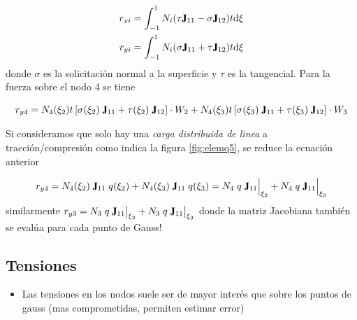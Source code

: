 \begin{align}
r_{xi}&=\int^1_{-1}N_i (\tau \jac_{11}- \sigma \jac_{12})t\di \xi \\
r_{yi}&=\int^1_{-1}N_i (\sigma \jac_{11}+\tau \jac_{12})t \di \xi 
\end{align}
donde $\sigma$ es la solicitación normal a la superficie y $\tau$ es la tangencial. Para la fuerza sobre el nodo 4 se tiene

$$r_{y4}= N_4(\xi_2)t\left[\sigma(\xi_2)\; \jac_{11}+\tau(\xi_2)\; \jac_{12}\right] \cdot W_2 + N_4(\xi_3)t\left[\sigma(\xi_3)\; \jac_{11}+\tau(\xi_3)\; \jac_{12}\right]\cdot W_3 $$

Si consideramos que solo hay una \emph{carga distribuida de linea} a tracción/compresión como indica la figura \ref{fig:elemq5}, se reduce la ecuación anterior

$$ r_{y4} = N_4(\xi_2)\;\jac_{11}\;q(\xi_2) + N_4(\xi_3)\;\jac_{11}\;q(\xi_3) =N_4\;q \;\jac_{11}\Big|_{\xi_2} + N_4\;q\; \jac_{11}\Big|_{\xi_3} $$
similarmente $r_{y3} = N_3\;q \;\jac_{11}\big|_{\xi_2} + N_3\;q\; \jac_{11}\big|_{\xi_3} $ donde la matriz Jacobiana también se evalúa para cada punto de Gauss!


\subsection*{Tensiones}
    \begin{itemize}
        \item Las tensiones en los nodos suele ser de mayor interés que sobre los puntos de gauss (mas comprometidas, permiten estimar error)
    \end{itemize}

 
